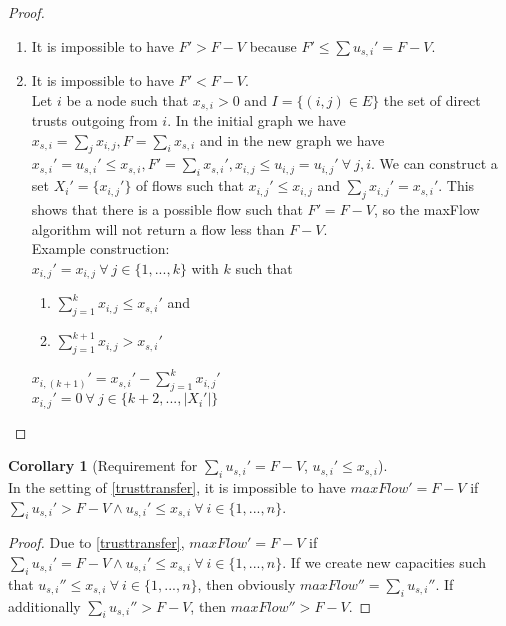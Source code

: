 \documentclass[11pt]{article}
\theoremstyle{definition}
\theoremstyle{corollary}
\newtheorem{corollary}{Corollary}[section]
\begin{document}
    \begin{proof} \
       \begin{enumerate}
         \item  It is impossible to have $F' > F - V$ because $F' \leq \sum{u_{s, i}'} = F - V$.
         \item  It is impossible to have $F' < F - V$. \\
         Let $i$ be a node such that $x_{s, i} > 0$ and $I = \{(i,j) \in E\}$ the set of direct trusts outgoing from $i$.
         In the initial graph we have $x_{s, i} = \sum_{j}{x_{i, j}}, F = \sum_{i}{x_{s, i}}$
         and in the new graph we have $x_{s, i}' = u_{s, i}' \leq x_{s, i},
         F' = \sum_{i}{x_{s, i}'}, x_{i, j} \leq u_{i, j} = u_{i, j}' \:\forall\: j, i$.
         We can construct a set $X_i' = \{x_{i, j}'\}$ of flows such that $x_{i, j}' \leq x_{i, j}$
         and $\sum_{j}{x_{i, j}'} = x_{s, i}'$. This shows that there is a possible flow such that $F' = F - V$,
         so the maxFlow algorithm will not return a flow less than $F - V$. \\
         Example construction: \\
         $x_{i, j}' = x_{i, j} \:\forall \:j \in \{1,...,k\}$ with $k$ such that
            \begin{enumerate}
	      \item $\sum_{j=1}^{k}{x_{i, j}} \leq x_{s, i}'$ and
	      \item $\sum_{j=1}^{k+1}{x_{i, j}} > x_{s, i}'$
            \end{enumerate}
         $x_{i, (k+1)}' = x_{s, i}' - \sum_{j=1}^{k}{x_{i, j}'}$ \\
         $x_{i, j}' = 0 \:\forall \:j \in \{k+2,...,|X_i'|\}$
       \end{enumerate}
    \end{proof}

    \begin{corollary}[Requirement for $\sum_{i}{u_{s, i}'} = F - V$, $u_{s, i}' \leq x_{s, i}$] \ \\
       In the setting of \ref{trusttransfer}, it is impossible to have $maxFlow' = F - V$ if $\sum_{i}{u_{s, i}'} > F - V
       \wedge u_{s, i}' \leq x_{s, i}\: \forall \:i \in \{1,...,n\}$.
    \end{corollary}
    \begin{proof}
       Due to \ref{trusttransfer}, $maxFlow' = F - V$ if $\sum_{i}{u_{s, i}'} = F - V
       \wedge u_{s, i}' \leq x_{s, i}\: \forall \:i \in \{1,...,n\}$. If we create new capacities such that
       $u_{s,i}'' \leq x_{s,i}\:\forall\:i \in \{1,...,n\}$, then obviously $maxFlow'' = \sum_{i}{u_{s,i}''}$. If
       additionally $\sum_{i}{u_{s,i}''} > F - V$, then $maxFlow'' > F - V$.
    \end{proof}
\end{document}
